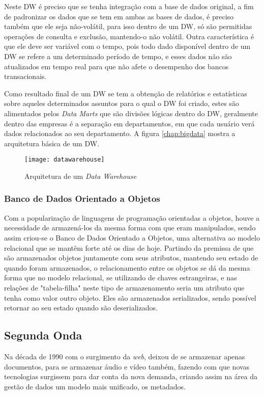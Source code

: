 Neste DW é preciso que se tenha integração com a base de dados original, a fim de padronizar os dados que se tem em ambas as bases de dados, é preciso também que ele seja não-volátil, para isso dentro de um DW, só são permitidas operações de consulta e exclusão, mantendo-o não volátil. Outra característica é que ele deve ser variável com o tempo, pois todo dado disponível dentro de um DW se refere a um determinado período de tempo, e esses dados não são atualizados em tempo real para que não afete o desempenho dos bancos transacionais.

Como resultado final de um DW se tem a obtenção de relatórios e estatísticas sobre aqueles determinados assuntos para o qual o DW foi criado, estes são alimentados pelos \textit{Data Marts} que são divisões lógicas dentro do DW, geralmente dentro das empresas é a separação em departamentos, em que cada usuário verá dados relacionados ao seu departamento. A figura \ref{chap:bigdata} mostra a arquitetura básica de um DW.~\cite{datawarehouse}

\begin{figure}[!h]
\caption{\label{fig:sqlquery} Arquitetura de um \textit{Data Warehouse}}
\begin{center}
\texttt{[image: datawarehouse]}
\end{center}
\end{figure}

\subsubsection{Banco de Dados Orientado a Objetos}
\label{subsubsec:bdoo}
Com a popularização de linguagens de programação orientadas a objetos, houve a necessidade de armazená-los da mesma forma com que eram manipulados, sendo assim criou-se o Banco de Dados Orientado a Objetos, uma alternativa ao modelo relacional que se mantêm forte até os dias de hoje. Partindo da premissa de que são armazenados objetos juntamente com seus atributos, mantendo seu estado de quando foram armazenados, o relacionamento entre os objetos se dá da mesma forma que no modelo relacional, se utilizando de chaves estrangeiras, e nas relações de "tabela-filha" neste tipo de armazenamento seria um atributo que tenha como valor outro objeto. Eles são armazenados serializados, sendo possível retornar ao seu estado quando são deserializados.~\cite{bdoo}

\subsection{Segunda Onda}
\label{subsec:segundaonda}
Na década de 1990 com o surgimento da \textit{web}, deixou de se armazenar apenas documentos, para se armazenar áudio e vídeo também, fazendo com que novas tecnologias surgissem para dar conta da nova demanda, criando assim na área da gestão de dados um modelo mais unificado, os metadados.~\cite{leigos}

